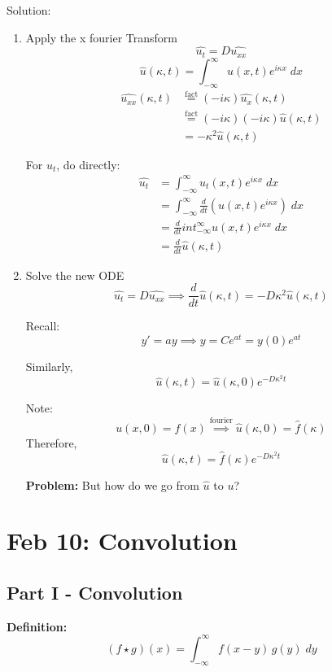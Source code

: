 \documentclass[12pt]{article}
\newcommand{\ans}[1]{\boxed{\text{#1}}}
\renewcommand{\hat}[1]{\widehat{#1}}
\begin{document}
Solution:
\begin{enumerate}
    \item Apply the x fourier Transform
    \[\hat{u_t} = D \hat{u_{xx}}\]
    \[\hat{u}(\kappa, t) = \int_{-\infty}^\infty u(x, t)e^{i\kappa x}\; dx\]
    \begin{align*}
        \widehat{u_{xx}}(\kappa, t) &\overset{\text{fact}}{=} (-i\kappa) \hat{u_x}(\kappa, t)\\
        &\overset{\text{fact}}{=} (-i\kappa)(-i\kappa) \hat{u}(\kappa, t)\\
        &= -\kappa^2 \hat{u}(\kappa, t)
    \end{align*}

    For $u_t$, do directly:
    \begin{align*}
        \hat{u_t} &= \int_{-\infty}^\infty u_t(x, t) e^{i\kappa x} \; dx \\
        &= \int_{-\infty}^\infty \frac{d}{dt}(u(x, t)e^{i\kappa x}) \; dx\\
        &= \frac{d}{dt}int_{-\infty}^\infty u(x, t)e^{i\kappa x} \; dx\\
        &= \frac{d}{dt} \hat{u}(\kappa, t)
    \end{align*}

    \item Solve the new ODE 
    \[\hat{u_t} = D\hat{u_{xx}} \implies \frac{d}{dt}\hat{u}(\kappa, t) = -D\kappa^2 \hat{u}(\kappa, t)\]
    
    Recall:
    \[y' = ay \implies y= Ce^{at} = y(0)e^{at}\]

    Similarly, 
    \[\hat{u}(\kappa, t) = \hat{u}(\kappa, 0)e^{-D\kappa^2t} \]

    Note: 
    \[u(x, 0) = f(x) \overset{\text{fourier}}{\implies} \hat{u}(\kappa, 0) = \hat{f}(\kappa)\]
    Therefore, 
    \[\ans{$\hat{u}(\kappa, t) = \hat{f}(\kappa)e^{-D\kappa^2t}$}\]

    \textbf{Problem:} But how do we go from $\hat{u}$ to $u$?
\end{enumerate}

\section{Feb 10: Convolution}
\subsection*{Part I - Convolution}
\textbf{Definition:}
\[(f \star g)(x) = \int_{-\infty}^\infty f(x - y)\, g(y)\; dy\]
\end{document}

